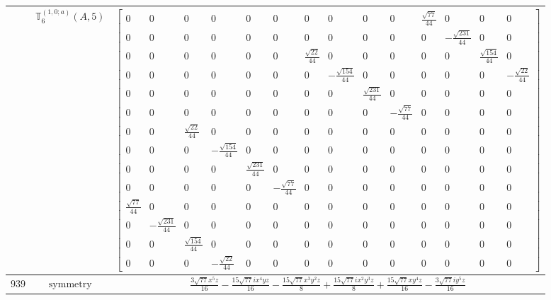 \documentclass[fleqn,8pt,landscape]{jsarticle}
\begin{document}
\begin{longtable}{ccc}
$  $ & $ \mathbb{T}_{6}^{(1,0;a)}(A,5) $ & $ \begin{bmatrix} 0 & 0 & 0 & 0 & 0 & 0 & 0 & 0 & 0 & 0 & \frac{\sqrt{77}}{44} & 0 & 0 & 0 \\ 0 & 0 & 0 & 0 & 0 & 0 & 0 & 0 & 0 & 0 & 0 & - \frac{\sqrt{231}}{44} & 0 & 0 \\ 0 & 0 & 0 & 0 & 0 & 0 & \frac{\sqrt{22}}{44} & 0 & 0 & 0 & 0 & 0 & \frac{\sqrt{154}}{44} & 0 \\ 0 & 0 & 0 & 0 & 0 & 0 & 0 & - \frac{\sqrt{154}}{44} & 0 & 0 & 0 & 0 & 0 & - \frac{\sqrt{22}}{44} \\ 0 & 0 & 0 & 0 & 0 & 0 & 0 & 0 & \frac{\sqrt{231}}{44} & 0 & 0 & 0 & 0 & 0 \\ 0 & 0 & 0 & 0 & 0 & 0 & 0 & 0 & 0 & - \frac{\sqrt{77}}{44} & 0 & 0 & 0 & 0 \\ 0 & 0 & \frac{\sqrt{22}}{44} & 0 & 0 & 0 & 0 & 0 & 0 & 0 & 0 & 0 & 0 & 0 \\ 0 & 0 & 0 & - \frac{\sqrt{154}}{44} & 0 & 0 & 0 & 0 & 0 & 0 & 0 & 0 & 0 & 0 \\ 0 & 0 & 0 & 0 & \frac{\sqrt{231}}{44} & 0 & 0 & 0 & 0 & 0 & 0 & 0 & 0 & 0 \\ 0 & 0 & 0 & 0 & 0 & - \frac{\sqrt{77}}{44} & 0 & 0 & 0 & 0 & 0 & 0 & 0 & 0 \\ \frac{\sqrt{77}}{44} & 0 & 0 & 0 & 0 & 0 & 0 & 0 & 0 & 0 & 0 & 0 & 0 & 0 \\ 0 & - \frac{\sqrt{231}}{44} & 0 & 0 & 0 & 0 & 0 & 0 & 0 & 0 & 0 & 0 & 0 & 0 \\ 0 & 0 & \frac{\sqrt{154}}{44} & 0 & 0 & 0 & 0 & 0 & 0 & 0 & 0 & 0 & 0 & 0 \\ 0 & 0 & 0 & - \frac{\sqrt{22}}{44} & 0 & 0 & 0 & 0 & 0 & 0 & 0 & 0 & 0 & 0 \end{bmatrix} $ \\ \hline
$ 939 $ & $ \text{symmetry} $ & $ \frac{3 \sqrt{77} x^{5} z}{16} - \frac{15 \sqrt{77} i x^{4} y z}{16} - \frac{15 \sqrt{77} x^{3} y^{2} z}{8} + \frac{15 \sqrt{77} i x^{2} y^{3} z}{8} + \frac{15 \sqrt{77} x y^{4} z}{16} - \frac{3 \sqrt{77} i y^{5} z}{16} $ \\

\end{longtable}
\end{document}
